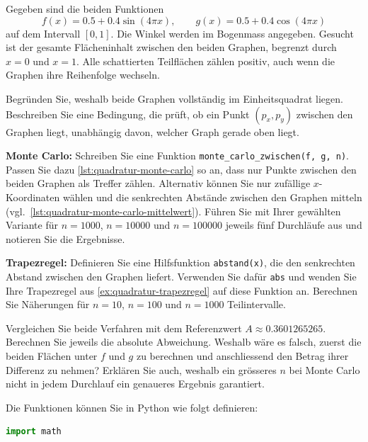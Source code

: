 \begin{myexercise}\label{ex:quadratur-zwischen-graphen}
Gegeben sind die beiden Funktionen
\[
    f(x)=0.5+0.4\sin(4\pi x), \qquad
    g(x)=0.5+0.4\cos(4\pi x)
\]
auf dem Intervall $[0,1]$. Die Winkel werden im Bogenmass angegeben.
Gesucht ist der gesamte Flächeninhalt zwischen den beiden Graphen, begrenzt durch $x=0$ und $x=1$.
Alle schattierten Teilflächen zählen positiv, auch wenn die Graphen ihre Reihenfolge wechseln.

\begin{center}
    
\end{center}

\begin{aenum}
    \item Begründen Sie, weshalb beide Graphen vollständig im Einheitsquadrat liegen. Beschreiben Sie eine Bedingung, die prüft, ob ein Punkt $(p_x,p_y)$ zwischen den Graphen liegt, unabhängig davon, welcher Graph gerade oben liegt.
    \item \textbf{Monte Carlo:} Schreiben Sie eine Funktion \lstinline|monte_carlo_zwischen(f, g, n)|. Passen Sie dazu \cref{lst:quadratur-monte-carlo} so an, dass nur Punkte zwischen den beiden Graphen als Treffer zählen. Alternativ können Sie nur zufällige $x$-Koordinaten wählen und die senkrechten Abstände zwischen den Graphen mitteln (vgl.\ \cref{lst:quadratur-monte-carlo-mittelwert}). Führen Sie mit Ihrer gewählten Variante für $n=1000$, $n=10000$ und $n=100000$ jeweils fünf Durchläufe aus und notieren Sie die Ergebnisse.
    \item \textbf{Trapezregel:} Definieren Sie eine Hilfsfunktion \lstinline|abstand(x)|, die den senkrechten Abstand zwischen den Graphen liefert. Verwenden Sie dafür \lstinline|abs| und wenden Sie Ihre Trapezregel aus \cref{ex:quadratur-trapezregel} auf diese Funktion an. Berechnen Sie Näherungen für $n=10$, $n=100$ und $n=1000$ Teilintervalle.
    \item Vergleichen Sie beide Verfahren mit dem Referenzwert $A\approx 0.3601265265$. Berechnen Sie jeweils die absolute Abweichung. Weshalb wäre es falsch, zuerst die beiden Flächen unter $f$ und $g$ zu berechnen und anschliessend den Betrag ihrer Differenz zu nehmen? Erklären Sie auch, weshalb ein grösseres $n$ bei Monte Carlo nicht in jedem Durchlauf ein genaueres Ergebnis garantiert.
\end{aenum}

Die Funktionen können Sie in Python wie folgt definieren:
\begin{lstlisting}[language=Python]
import math



\end{lstlisting}
\end{myexercise}
